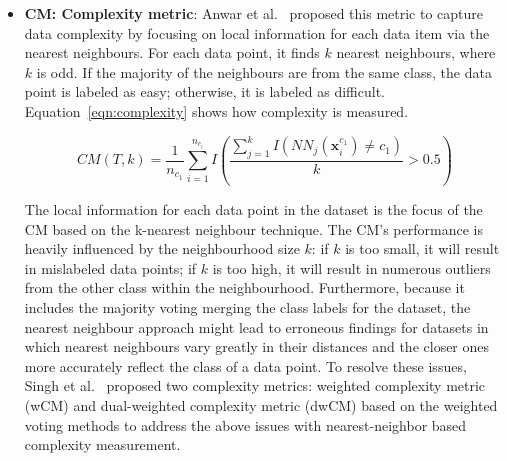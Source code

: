 \documentclass{article}
\begin{document}
\begin{itemize}
 \item \textbf{CM: Complexity metric}: Anwar et al.~\cite{anwarMeasurementDataComplexity2014} proposed this metric to capture data complexity by focusing on local information for each data item via the nearest neighbours. For each data point, it finds $k$ nearest neighbours, where $k$ is odd. If the majority of the neighbours are from the same class, the data point is labeled as easy; otherwise, it is labeled as difficult. Equation~\autoref{eqn:complexity} shows how complexity is measured.
 
 \begin{equation}
 \label{eqn:complexity}
  CM(T, k)=\frac{1}{n_{c_{1}}} \sum_{i=1}^{n_{c_{i}}} I\left(\frac{\sum_{j=1}^{k} I\left(N N_{j}\left(\mathbf{x}_{i}^{c_{1}}\right) \neq c_{1}\right)}{k}>0.5\right)
 \end{equation}

 The local information for each data point in the dataset is the focus of the CM based on the k-nearest neighbour technique. The CM's performance is heavily influenced by the neighbourhood size $k$: if $k$ is too small, it will result in mislabeled data points; if $k$ is too high, it will result in numerous outliers from the other class within the neighbourhood. Furthermore, because it includes the majority voting merging the class labels for the dataset, the nearest neighbour approach might lead to erroneous findings for datasets in which nearest neighbours vary greatly in their distances and the closer ones more accurately reflect the class of a data point. To resolve these issues, Singh et al.~\cite{singhWeightedKnearestNeighbor2020} proposed two complexity metrics: weighted complexity metric (wCM) and dual-weighted complexity metric (dwCM) based on the weighted voting methods to address the above issues with nearest-neighbor based complexity measurement.
 

\end{itemize}
\end{document}
